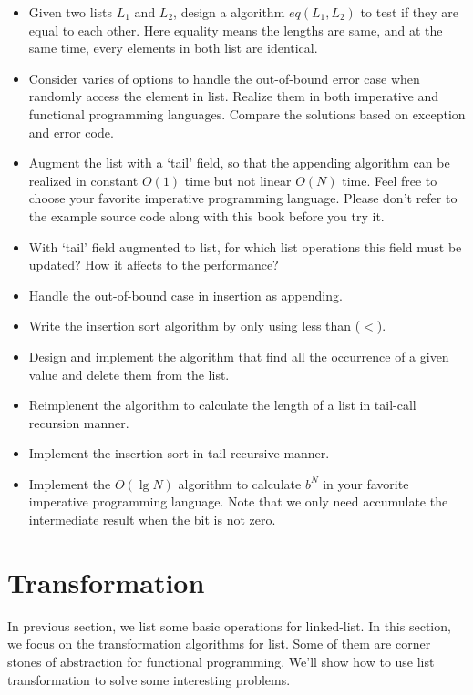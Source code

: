 \documentclass{article}
\begin{document}
\begin{Exercise}
\begin{itemize}
\item Given two lists $L_1$ and $L_2$, design a algorithm $eq(L_1, L_2)$ to test if they are equal to each other.
Here equality means the lengths are same, and at the same time, every elements in both list are identical.
\item Consider varies of options to handle the out-of-bound error case when randomly access the element in list. Realize
them in both imperative and functional programming languages. Compare the solutions based on exception and error code.
\item Augment the list with a `tail' field, so that the appending algorithm can be realized in constant $O(1)$ time but
not linear $O(N)$ time. Feel free to choose your favorite imperative programming language. Please don't refer to the
example source code along with this book before you try it.
\item With `tail' field augmented to list, for which list operations this field must be updated? How it affects to the
performance?
\item Handle the out-of-bound case in insertion as appending.
\item Write the insertion sort algorithm by only using less than ($<$).
\item Design and implement the algorithm that find all the occurrence of a given value and delete them from the list.
\item Reimplenent the algorithm to calculate the length of a list in tail-call recursion manner.
\item Implement the insertion sort in tail recursive manner.
\item Implement the $O(\lg N)$ algorithm to calculate $b^N$ in your favorite imperative programming language. Note that
we only need accumulate the intermediate result when the bit is not zero.
\end{itemize}
\end{Exercise}

\section{Transformation}
In previous section, we list some basic operations for linked-list. In this section, we focus on the transformation
algorithms for list. Some of them are corner stones of abstraction for functional programming. We'll show how to use
list transformation to solve some interesting problems.
\end{document}
